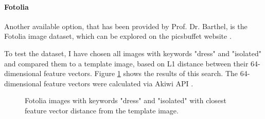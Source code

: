 \documentclass{article}
\begin{document}
\paragraph{Fotolia}
Another available option, that has been provided by Prof. Dr. Barthel, is the Fotolia image dataset, which can be explored on the picsbuffet website \cite{noauthor_picsbuffet_nodate}.

To test the dataset, I have chosen all images with keywords "dress" and "isolated" and compared them to a template image, based on L1 distance between their 64-dimensional feature vectors. Figure \ref{fig:fotolia} shows the results of this search. The 64-dimensional feature vectors were calculated via Akiwi API \cite{sonnenberg_akiwi_nodate}.

\begin{figure}[h]
\centering
{}\hspace{1cm}
\caption{\label{fig:fotolia} Fotolia images with keywords "dress" and "isolated" with closest feature vector distance from the template image.}
\end{figure}
\end{document}
